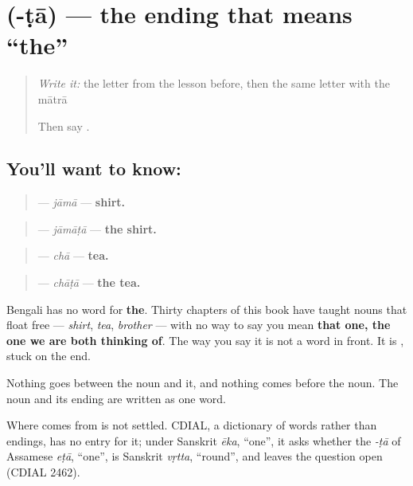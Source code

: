 \section[\texorpdfstring{\bn{টা} (-ṭā)}{টা (-ṭā)}]{ (-ṭā) — the ending that means \textquotedblleft{}the\textquotedblright{}}

\label{lesson:BN-C20-tta-classifier}



\begin{quote}
\emph{Write it:} the letter from the lesson before, then the same letter with the mātrā

Then say \textbf{}.
\end{quote}

\subsection*{You'll want to know: }
\begin{quote}
\textbf{} — \emph{jāmā} — \textbf{shirt.}
\end{quote}

\begin{quote}
\textbf{} — \emph{jāmāṭā} — \textbf{the shirt.}
\end{quote}

\begin{quote}
\textbf{} — \emph{chā} — \textbf{tea.}
\end{quote}

\begin{quote}
\textbf{} — \emph{chāṭā} — \textbf{the tea.}
\end{quote}

Bengali has no word for \textbf{the}. Thirty chapters of this book have taught nouns that float free — \emph{shirt}, \emph{tea}, \emph{brother} — with no way to say you mean \textbf{that one, the one we are both thinking of}. The way you say it is not a word in front. It is \textbf{}, stuck on the end.

Nothing goes between the noun and it, and nothing comes before the noun. The noun and its ending are written as one word.

\begin{cousinweb}
Where \textbf{} comes from is not settled. CDIAL, a dictionary of words rather than endings, has no entry for it; under Sanskrit \emph{ēka}, \textquotedblleft{}one\textquotedblright{}, it asks whether the \emph{-ṭā} of Assamese \emph{eṭā}, \textquotedblleft{}one\textquotedblright{}, is Sanskrit \emph{vṛtta}, \textquotedblleft{}round\textquotedblright{}, and leaves the question open (CDIAL 2462).
\end{cousinweb}


